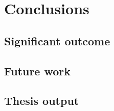 \chapter{Conclusions}                   \label{Chapter:conclusions}


\section{Significant outcome}           \label{Chapter:experiment/significant outcome}


\section{Future work}                   \label{Chapter:experiment/future work}


\section{Thesis output}                 \label{Chapter:experiment/thesis output}